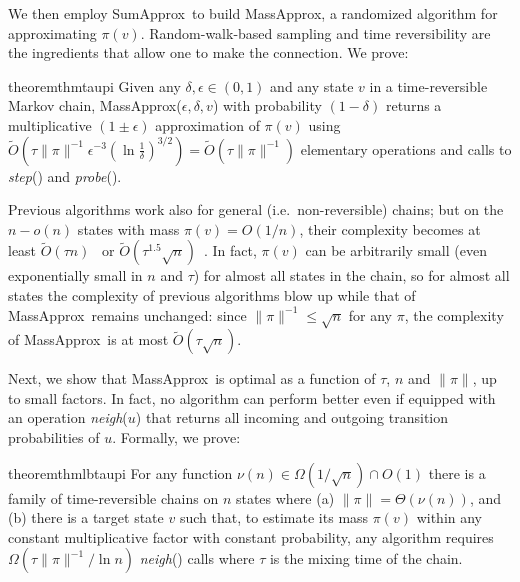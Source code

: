 \documentclass[a4paper,11pt]{article}
\newcommand{\neigh}[1]{\emph{neigh}(#1)}
\newcommand{\step}{\textit{step}}
\newcommand{\probe}{\textit{probe}}
\newcommand{\sumest}{SumApprox}
\newcommand{\taupiest}{MassApprox}
\begin{document}
We then employ \sumest\ to build \taupiest, a randomized algorithm for approximating $\pi(v)$.
Random-walk-based sampling and time reversibility are the ingredients that allow one to make the connection.
We prove:
\begin{restatable}{theorem}{thmtaupi}
\label{thm:ub_taupi}
Given any $\delta,\epsilon \in (0,1)$ and any state $v$ in a time-reversible Markov chain, \taupiest($\epsilon, \delta, v$) with probability $(1-\delta)$ returns a multiplicative $(1 \pm \epsilon)$ approximation of $\pi(v)$ using $\tilde{O}(\tau\|\pi\|^{-1} \epsilon^{-3} (\ln{\frac{1}{\delta}})^{3/2}) = \tilde{O}(\tau\|\pi\|^{-1})$ elementary operations and calls to \step() and \probe().
\end{restatable}
\noindent Previous algorithms work also for general (i.e.\ non-reversible) chains; but on the $n-o(n)$ states with mass $\pi(v) = O(1/n)$, their complexity becomes at least $\tilde{O}(\tau n)$~\cite{Lee&2013} or $\tilde{O}(\tau^{1.5} \sqrt{n})$~\cite{Lofgren&2015b}.
In fact, $\pi(v)$ can be arbitrarily small (even exponentially small in $n$ and $\tau$) for almost all states in the chain, so for almost all states the complexity of previous algorithms blow up while that of \taupiest\ remains unchanged: since $\|\pi\|^{-1} \le \sqrt{n}$ for any $\pi$, the complexity of \taupiest\ is at most $\tilde{O}(\tau \sqrt{n})$.

Next, we show that \taupiest\ is optimal as a function of $\tau$, $n$ and $\|\pi\|$, up to small factors.
In fact, no algorithm can perform better even if equipped with an operation \neigh{$u$} that returns all incoming and outgoing transition probabilities of $u$.
Formally, we prove:
\begin{restatable}{theorem}{thmlbtaupi}
\label{thm:lb_taupi}
For any function $\nu(n) \in \Omega(1/\sqrt{n}) \cap O(1)$ there is a family of time-reversible chains on $n$ states where (a) $\|\pi\|=\Theta(\nu(n))$, and (b) there is a target state $v$ such that, to estimate its mass $\pi(v)$ within any constant multiplicative factor with constant probability, any algorithm requires $\Omega(\tau \|\pi\|^{-1} / \ln{n})$ \neigh{} calls where $\tau$ is the mixing time of the chain.
\end{restatable}
\end{document}
